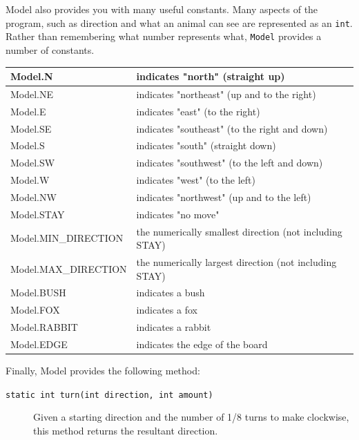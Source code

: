 \documentclass[10pt,letterpaper]{article}
\begin{document}
	Model also provides you with many useful constants.
	Many aspects of the program, such as direction and what an animal can see are represented as an \texttt{int}.  
	Rather than remembering what number represents what, \texttt{Model} provides a number of constants.
	
	\begin{center}
	\begin{tabular}{ |l| l|}
		\hline
		\rowcolor{yellow}Model.N &	indicates "north" (straight up) \\\hline
		\rowcolor{yellow}Model.NE &	indicates "northeast" (up and to the right)\\\hline
		\rowcolor{yellow}Model.E &	indicates "east" (to the right)\\\hline
		\rowcolor{yellow}Model.SE &	indicates "southeast" (to the right and down)\\\hline
		\rowcolor{yellow}Model.S &	indicates "south" (straight down)\\\hline
		\rowcolor{yellow}Model.SW &	indicates "southwest" (to the left and down)\\\hline
		\rowcolor{yellow}Model.W &	indicates "west" (to the left)\\\hline
		\rowcolor{yellow}Model.NW &	indicates "northwest" (up and to the left)\\\hline
		\rowcolor{yellow}Model.STAY &	indicates "no move"\\\hline
		
		\rowcolor{green}Model.MIN\_DIRECTION &	the numerically smallest direction (not including STAY)\\\hline
		\rowcolor{green}Model.MAX\_DIRECTION &	the numerically largest direction (not including STAY)\\\hline
		\rowcolor[HTML]{AAACED} Model.BUSH &	indicates a bush\\\hline
		\rowcolor[HTML]{AAACED}Model.FOX &	indicates a fox\\\hline
		\rowcolor[HTML]{AAACED}Model.RABBIT &	indicates a rabbit\\\hline
		\rowcolor[HTML]{AAACED}Model.EDGE &	indicates the edge of the board\\\hline
	\end{tabular}
	\end{center}

	Finally, Model provides the following method:
	\begin{description}
	\item[\texttt{static int turn(int direction, int amount)}] Given a starting direction and the number of 1/8 turns to make clockwise, this method returns the resultant direction. 
	
	\end{description}
	
\end{document}
